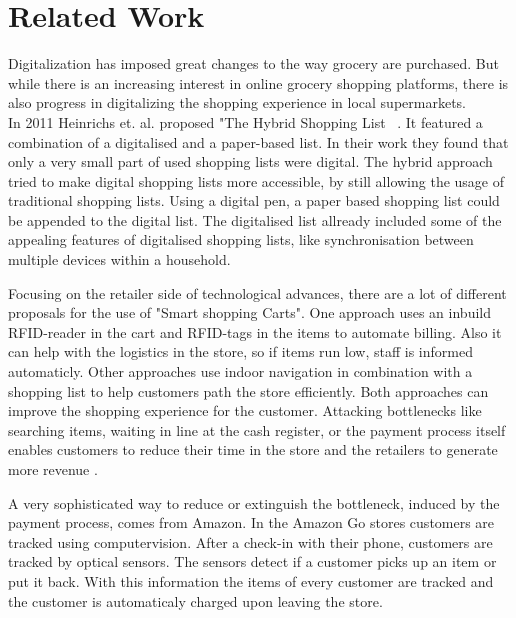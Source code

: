 
\chapter{Related Work}\label{chapter:related_work}

Digitalization has imposed great changes to the way grocery are purchased.
But while there is an increasing interest in online grocery shopping platforms, there is also progress in digitalizing the shopping experience in local supermarkets.\\

In 2011 Heinrichs et. al. proposed "The Hybrid Shopping List ~\cite{heinrichs2011hybrid}. It featured a combination of a digitalised and a paper-based list. In their work they found that only a very small part of used shopping lists were digital. The hybrid approach tried to make digital shopping lists more accessible, by still allowing the usage of traditional shopping lists. 
Using a digital pen, a paper based shopping list could be appended to the digital list. The digitalised list allready included some of the appealing features of digitalised shopping lists, like synchronisation between multiple devices within a household.

Focusing on the retailer side of technological advances, there are a lot of different proposals for the use of "Smart shopping Carts". One approach \cite{7932080}
uses an inbuild RFID-reader in the cart and RFID-tags in the items to automate billing. Also it can help with the logistics in the store, so if items run low, staff is informed automaticly. Other approaches use indoor navigation in combination with a shopping list to help customers path the store efficiently. Both approaches can improve the shopping experience for the customer. Attacking bottlenecks like searching items, waiting in line at the cash register, or the payment process itself enables customers to reduce their time in the store and the retailers to generate more revenue \cite{inproceedings}.

A very sophisticated way to reduce or extinguish the bottleneck, induced by the payment process, comes from Amazon. In the Amazon Go stores \cite{wankhede2018just} customers are tracked using computervision. After a check-in with their phone, customers are tracked by optical sensors. The sensors detect if a customer picks up an item or put it back. With this information the items of every customer are tracked and the customer is automaticaly charged upon leaving the store.